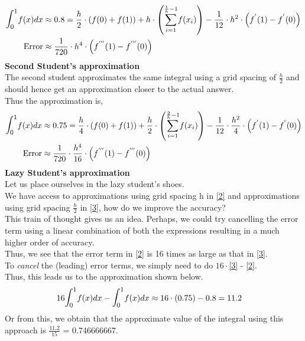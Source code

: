 \documentclass[letterpaper]{exam}
\begin{document}
\begin{questions}
\begin{solution}
\begin{align}\label{2}
\mathlarger{\mathlarger{\int}}_0^1 f(x) dx &\approx 0.8 =  \frac{h}{2}\cdot\left(f(0) + f(1)\right) + h \cdot \left(\overset{\frac{1}{h}-1}{\underset{i=1}{\sum}} f(x_i)\right) - \frac{1}{12}\cdot h^2 \cdot \left(f^{'}(1) - f^{'}(0)\right) \\ 
\text{Error} &\approx \frac{1}{720}\cdot h^4 \cdot \left(f^{'''}(1) - f^{'''}(0)\right)
\end{align}
\textbf{Second Student's approximation}\\
The second student approximates the same integral using a grid spacing of $\frac{h}{2}$ and should hence get an approximation closer to the actual answer.\\
Thus the approximation is,
\begin{align}\label{3}
\mathlarger{\mathlarger{\int}}_0^1 f(x) dx &\approx 0.75 =  \frac{h}{4}\cdot\left(f(0) + f(1)\right) + \frac{h}{2} \cdot \left(\overset{\frac{2}{h}-1}{\underset{i=1}{\sum}} f(x_i)\right) - \frac{1}{12}\cdot \frac{h^2}{4} \cdot \left(f^{'}(1) - f^{'}(0)\right) \\ 
\text{Error} &\approx \frac{1}{720}\cdot \frac{h^4}{16} \cdot \left(f^{'''}(1) - f^{'''}(0)\right)
\end{align}
\textbf{Lazy Student's approximation}\\
Let us place ourselves in the lazy student's shoes.\\
We have access to approximations using grid spacing h in \ref{2} and approximations using grid spacing $\frac{h}{2}$ in \ref{3}, how do we improve the accuracy?\\
This train of thought gives us an idea. Perhaps, we could try cancelling the error term using a linear combination of both the expressions resulting in a much higher order of accuracy.\\
Thus, we see that the error term in \ref{2} is 16 times as large as that in \ref{3}.\\
To \textit{cancel} the (leading) error terms, we simply need to do $16 \cdot $\ref{3} - \ref{2}.\\
Thus, this leads us to the approximation shown below.
\begin{align*}
    16\mathlarger{\mathlarger{\int}}_0^1 f(x) dx - \mathlarger{\mathlarger{\int}}_0^1 f(x) dx &\approx 16\cdot(0.75) - 0.8 = 11.2
\end{align*}
Or from this, we obtain that the approximate value of the integral using this approach is $\frac{11.2}{15}$  = 0.746666667.\\

\end{solution}
\end{questions}
\end{document}
